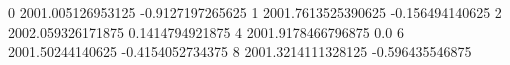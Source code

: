 0 2001.005126953125 -0.9127197265625
1 2001.7613525390625 -0.156494140625
2 2002.059326171875 0.1414794921875
4 2001.9178466796875 0.0
6 2001.50244140625 -0.4154052734375
8 2001.3214111328125 -0.596435546875

